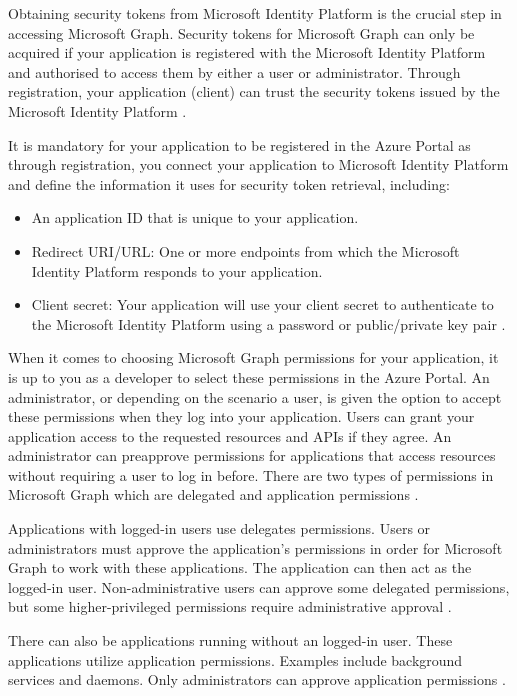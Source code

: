 Obtaining security tokens from Microsoft Identity Platform is the crucial step in accessing Microsoft Graph. Security tokens for Microsoft Graph can only be acquired if your application is registered with the Microsoft Identity Platform and authorised to access them by either a user or administrator. Through registration, your application (client) can trust the security tokens issued by the Microsoft Identity Platform \cite{MSAA}.

It is mandatory for your application to be registered in the Azure Portal as through registration, you connect your application to Microsoft Identity Platform and define the information it uses for security token retrieval, including:

\begin{itemize}
 \item An application ID that is unique to your application.
 \item Redirect URI/URL: One or more endpoints from which the Microsoft Identity Platform responds to your application.
 \item Client secret: Your application will use your client secret to authenticate to the Microsoft Identity Platform using a password or public/private key pair \cite{MSAA}.
\end{itemize}

When it comes to choosing Microsoft Graph permissions for your application, it is up to you as a developer to select these permissions in the Azure Portal. An administrator, or depending on the scenario a user, is given the option to accept these permissions when they log into your application. Users can grant your application access to the requested resources and APIs if they agree. An administrator can preapprove permissions for applications that access resources without requiring a user to log in before. There are two types of permissions in Microsoft Graph which are delegated and application permissions \cite{MSAA}.

Applications with logged-in users use delegates permissions. Users or administrators must approve the application's permissions in order for Microsoft Graph to work with these applications. The application can then act as the logged-in user. Non-administrative users can approve some delegated permissions, but some higher-privileged permissions require administrative approval \cite{MSAA}.

There can also be applications running without an logged-in user. These applications utilize application permissions. Examples include background services and daemons. Only administrators can approve application permissions \cite{MSAA}.

